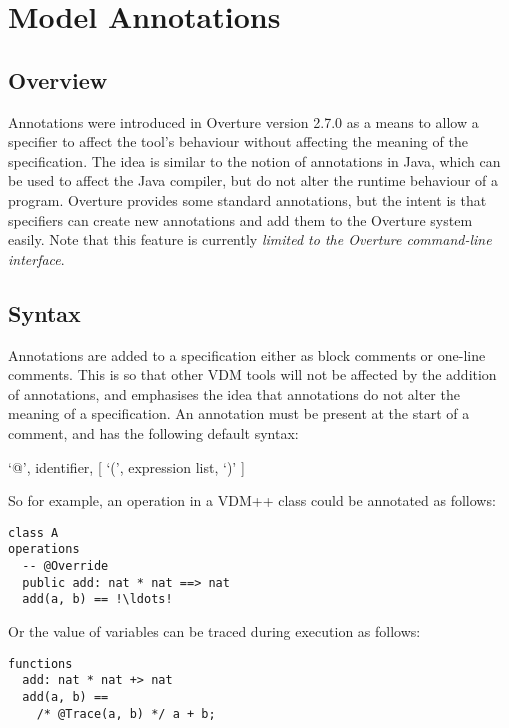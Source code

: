 
\chapter{Model Annotations}\label{sec:annotations}

\section{Overview}

Annotations were introduced in Overture version 2.7.0 as a means to
allow a specifier to affect the tool’s behaviour without affecting the
meaning of the specification. The idea is similar to the notion of
annotations in Java, which can be used to affect the Java compiler,
but do not alter the runtime behaviour of a program. Overture provides
some standard annotations, but the intent is that specifiers can
create new annotations and add them to the Overture system
easily. Note that this feature is currently \emph{limited to the
  Overture command-line interface}.

\section{Syntax}\label{sec:annotations-syntax}

Annotations are added to a specification either as block comments or
one-line comments. This is so that other VDM tools will not be
affected by the addition of annotations, and emphasises the idea that
annotations do not alter the meaning of a specification. An annotation
must be present at the start of a comment, and has the following
default syntax:

\begin{description}
\item `@', identifier, [ `(', expression list, `)' ]
\end{description}

\noindent So for example, an operation in a VDM++ class could be
annotated as follows:

\begin{lstlisting}[language=VDM++, frame=tlbr,escapechar=!]
class A
operations
  -- @Override
  public add: nat * nat ==> nat
  add(a, b) == !\ldots!
\end{lstlisting}

\noindent Or the value of variables can be traced during execution as
follows:

\begin{lstlisting}[language=VDM++, frame=tlbr]
functions
  add: nat * nat +> nat
  add(a, b) ==
    /* @Trace(a, b) */ a + b;
\end{lstlisting}

